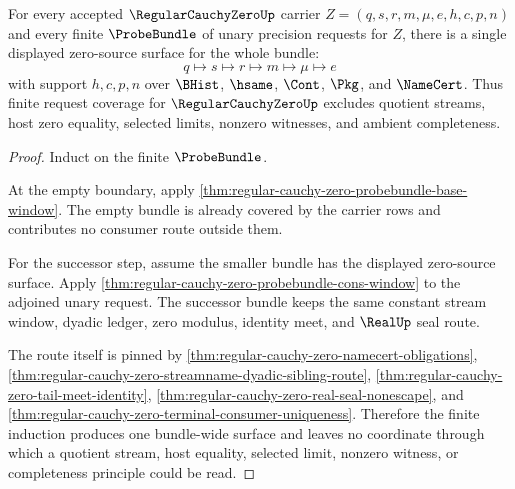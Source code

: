 \begin{theorem}
\label{thm:regular-cauchy-zero-probebundle-induction-coverage}
For every accepted $\RegularCauchyZeroUp$ carrier $Z=(q,s,r,m,\mu,e,h,c,p,n)$ and every finite $\ProbeBundle$ of unary precision requests for $Z$, there is a single displayed zero-source surface for the whole bundle:
$$
q \mapsto s \mapsto r \mapsto m \mapsto \mu \mapsto e
$$
with support $h,c,p,n$ over $\BHist$, $\hsame$, $\Cont$, $\Pkg$, and $\NameCert$. Thus finite request coverage for $\RegularCauchyZeroUp$ excludes quotient streams, host zero equality, selected limits, nonzero witnesses, and ambient completeness.
\end{theorem}
\begin{proof}
Induct on the finite $\ProbeBundle$.

At the empty boundary, apply \autoref{thm:regular-cauchy-zero-probebundle-base-window}. The empty bundle is already covered by the carrier rows and contributes no consumer route outside them.

For the successor step, assume the smaller bundle has the displayed zero-source surface. Apply \autoref{thm:regular-cauchy-zero-probebundle-cons-window} to the adjoined unary request. The successor bundle keeps the same constant stream window, dyadic ledger, zero modulus, identity meet, and $\RealUp$ seal route.

The route itself is pinned by \autoref{thm:regular-cauchy-zero-namecert-obligations}, \autoref{thm:regular-cauchy-zero-streamname-dyadic-sibling-route}, \autoref{thm:regular-cauchy-zero-tail-meet-identity}, \autoref{thm:regular-cauchy-zero-real-seal-nonescape}, and \autoref{thm:regular-cauchy-zero-terminal-consumer-uniqueness}. Therefore the finite induction produces one bundle-wide surface and leaves no coordinate through which a quotient stream, host equality, selected limit, nonzero witness, or completeness principle could be read.
\end{proof}


